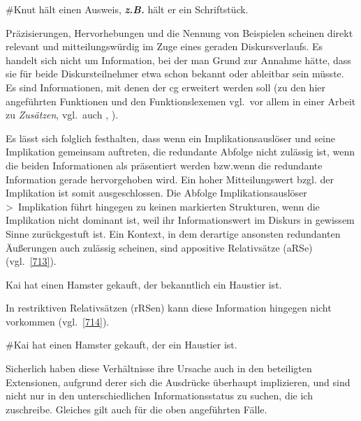 \begin{exe}
	\ex\label{712} 
	\#Knut hält einen Ausweis, \textbf{\textit{z.B.}} hält er ein Schriftstück.
\end{exe}
Präzisierungen, Hervorhebungen und die Nennung von Beispielen scheinen direkt relevant und mitteilungswürdig im Zuge eines geraden Diskursverlaufs. Es handelt sich nicht um Information, bei der man Grund zur Annahme hätte, dass sie für beide Diskursteilnehmer etwa schon bekannt oder ableitbar sein müsste. Es sind Informationen, mit denen der cg erweitert werden soll (zu den hier angeführten Funktionen und den Funktionslexemen vgl.\ vor allem \citealt{Schindler1990} in einer Arbeit zu  \textit{Zusätzen}, vgl.\ auch \citealt{Auer1991}, \citealt{Freienstein2008}).

Es lässt sich folglich festhalten, dass wenn ein Implikationsauslöser und seine Implikation gemeinsam auftreten, die redundante Abfolge nicht zulässig ist, wenn die beiden Informationen als  präsentiert werden bzw.\linebreak wenn die redundante Information gerade hervorgehoben wird. Ein hoher Mitteilungswert bzgl. der Implikation ist somit ausgeschlossen. Die Abfolge Implikationsauslöser \textgreater\ Implikation führt hingegen zu keinen markierten Strukturen, wenn die Implikation nicht dominant ist, weil ihr Informationswert im Diskurs in gewissem Sinne zurückgestuft ist. Ein Kontext, in dem derartige ansonsten redundanten Äußerungen auch zulässig scheinen, sind appositive Relativsätze  (aRSe) (vgl.\ \ref{713}).
\begin{exe}
	\ex\label{713} 
	Kai hat einen Hamster gekauft, der bekanntlich ein Haustier ist.
\end{exe}
In restriktiven Relativsätzen  (rRSen) kann diese Information hingegen nicht vor\-kommen (vgl.\ \ref{714}).
\begin{exe}
	\ex\label{714} 
	\#Kai hat einen Hamster gekauft, der ein Haustier ist.
\end{exe}
Sicherlich haben diese Verhältnisse ihre Ursache auch in den beteiligten Extensionen, aufgrund derer sich die Ausdrücke überhaupt implizieren, und sind nicht nur in den unterschiedlichen Informationsstatus zu suchen, die ich zuschreibe. Gleiches gilt auch für die oben angeführten Fälle.

